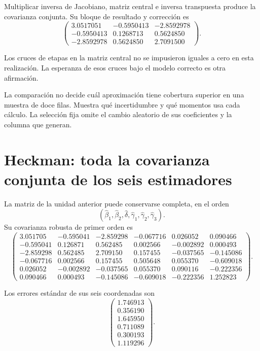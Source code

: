 \documentclass[11pt,a4paper]{article}
\begin{document}
Multiplicar inversa de Jacobiano,
matriz central e inversa
transpuesta produce la
covarianza conjunta.
Su bloque de resultado y
corrección es
\[
\begin{pmatrix}3.0517051&-0.5950413&-2.8592978\\-0.5950413&0.1268713&0.5624850\\-2.8592978&0.5624850&2.7091500\end{pmatrix}.
\]

Los cruces de etapas
en la matriz central
no se impusieron iguales
a cero en esta realización.
La esperanza de esos
cruces bajo el modelo
correcto es otra afirmación.

La comparación no decide
cuál aproximación tiene
cobertura superior en una
muestra de doce filas.
Muestra qué incertidumbre
y qué momentos
usa cada cálculo.
La selección fija omite
el cambio aleatorio de
sus coeficientes y la
columna que generan.

\clearpage
\section{Heckman: toda la covarianza conjunta de los seis estimadores}\label{unidad164}
La matriz de la unidad anterior
puede conservarse completa,
en el orden
\[
(\widehat\beta_1,\widehat\beta_2,
\widehat\delta,\widehat\gamma_1,
\widehat\gamma_2,\widehat\gamma_3).
\]
Su covarianza robusta
de primer orden es
\[
\begin{pmatrix}3.051705&-0.595041&-2.859298&-0.067716&0.026052&0.090466\\-0.595041&0.126871&0.562485&0.002566&-0.002892&0.000493\\-2.859298&0.562485&2.709150&0.157455&-0.037565&-0.145086\\-0.067716&0.002566&0.157455&0.505648&0.055370&-0.609018\\0.026052&-0.002892&-0.037565&0.055370&0.090116&-0.222356\\0.090466&0.000493&-0.145086&-0.609018&-0.222356&1.252823\end{pmatrix}.
\]

Los errores estándar
de sus seis coordenadas son
\[
\begin{pmatrix}1.746913\\0.356190\\1.645950\\0.711089\\0.300193\\1.119296\end{pmatrix}.
\]
\end{document}
